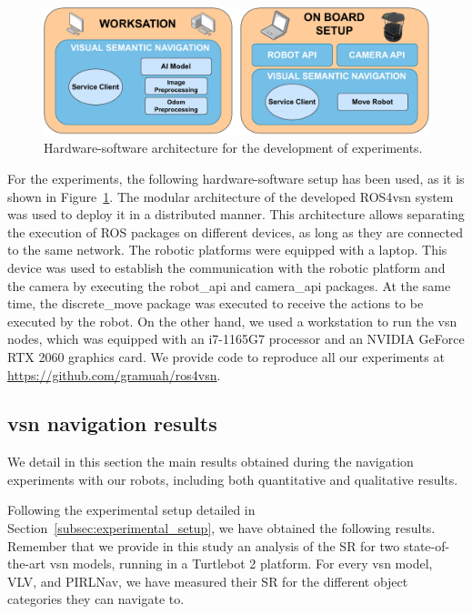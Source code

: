 \begin{figure}
    \centering
        \includegraphics[width=\linewidth]{figures/ros4vsn/hw-sw-scheme}
        \caption{Hardware-software architecture for the development of experiments.}
        \label{fig:setup_experiment}
\end{figure}

For the experiments, the following hardware-software setup has been used, as it is shown in Figure~\ref{fig:setup_experiment}.
The modular architecture of the developed ROS4\acrshort{vsn} system was used to deploy it in a distributed manner.
This architecture allows separating the execution of ROS packages on different devices, as long as they are connected to the same network.
The robotic platforms were equipped with a laptop.
This device was used to establish the communication with the robotic platform and the camera by executing the robot\_api and camera\_api packages.
At the same time, the discrete\_move package was executed to receive the actions to be executed by the robot.
On the other hand, we used a workstation to run the \acrshort{vsn} nodes, which was equipped with an i7-1165G7 processor and an NVIDIA GeForce RTX 2060 graphics card.
We provide code to reproduce all our experiments at \url{https://github.com/gramuah/ros4vsn}.


\subsection{\acrshort{vsn} navigation results}
\label{subsec:vsn}
We detail in this section the main results obtained during the navigation experiments with our robots, including both quantitative and qualitative results.

Following the experimental setup detailed in Section~\ref{subsec:experimental_setup}, we have obtained the following results.
Remember that we provide in this study an analysis of the SR for two state-of-the-art \acrshort{vsn} models, running in a Turtlebot 2 platform.
For every \acrshort{vsn} model, \ie VLV, and PIRLNav, we have measured their SR for the different object categories they can navigate to.

